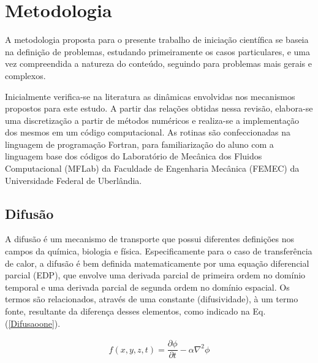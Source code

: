 	
\newpage
	

 \section{Metodologia}

\noindent

	A metodologia proposta para o presente trabalho de iniciação científica se baseia
na definição de problemas, estudando primeiramente os casos particulares, e uma vez
compreendida a natureza do conteúdo, seguindo para problemas mais gerais e complexos.

	Inicialmente verifica-se na literatura as dinâmicas envolvidas nos mecanismos propostos para este estudo. A partir das relações obtidas nessa revisão, elabora-se uma discretização a partir de métodos numéricos e realiza-se a implementação dos mesmos em um código computacional. As rotinas são confeccionadas na linguagem de programação Fortran, para familiarização do aluno com a linguagem base dos códigos do Laboratório de Mecânica dos Fluidos Computacional (MFLab) da Faculdade de Engenharia Mecânica (FEMEC) da Universidade Federal de Uberlândia.
 

\subsection{Difusão}

\noindent

	A difusão é um mecanismo de transporte que possui diferentes definições nos campos da química, biologia e física. Especificamente para o caso de transferência de calor, a difusão é bem definida matematicamente por uma equação diferencial parcial (EDP), que envolve uma derivada parcial de primeira ordem no domínio temporal e uma derivada parcial de segunda ordem no domínio espacial. Os termos são relacionados, através de uma constante (difusividade), à um termo fonte, resultante da diferença desses elementos, como indicado na Eq. (\ref{Difusaoone}).
	
\begin{align}
 \label{Difusaoone}
 f(x,y,z,t) = \dfrac{\partial \phi}{\partial t} - \alpha \nabla^2 \phi
\end{align}

